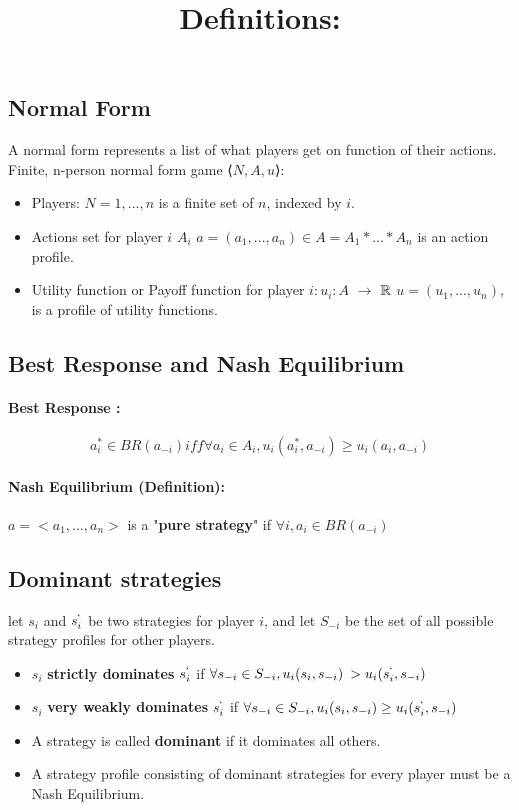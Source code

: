\subsection{Normal Form}
A normal form represents a list of what players get on function of their actions.
Finite, n-person normal form game  ⟨$N, A, u$⟩:
\begin{itemize}
\item Players: $ N = {1, ... , n} $ is a finite set of $n$, indexed by $i$.
\item Actions set for player $i$ $A_i$
\subitem $a = (a_1,...,a_n) \in A = A_1 * ... * A_n $ is an action profile.
\item Utility function or Payoff function for player $i: u_i : A $  $\to$ ${\Bbb{R}}$
\subitem $u = (u_1,..., u_n)$, is a profile of utility functions.
\end{itemize}
\subsection{Best Response and Nash Equilibrium}\label{subsection}
\paragraph{Best Response :}
\begin{equation}\label{eq:1}
 a_i^* \in BR(a_{-i})  iff   \forall a_i \in A_i, u_i(a_i^*,a_{-i}) \geq u_i(a_i, a_{-i})
\end{equation}
 
\paragraph{Nash Equilibrium (Definition):}
$a = <a_1,...,a_n>$ is a "\textbf{pure strategy}" if $\forall i, a_i \in BR(a_{-i})$
\subsection{Dominant strategies}
let $s_i$ and $s_i^`$ be two strategies for player $i$, and let $S_{-i}$ be the set of all possible strategy profiles for other players.
\bigbreak
\title{\textbf{Definitions:} }
\begin{itemize}
\item $s_i$ \textbf{strictly dominates} $s_i^`$ if $\forall s_{-i} \in S_{-i}, u_i(s_i, s_{-i}) \>> u_i(s_i^`, s_{-i})$
\item $s_i$ \textbf{very weakly dominates} $s_i^`$ if $\forall s_{-i} \in S_{-i}, u_i(s_i, s_{-i}) \geq u_i(s_i^`, s_{-i})$
\item A strategy is called \textbf{dominant} if it dominates all others.
\item A strategy profile consisting of dominant strategies for every player must be a Nash Equilibrium.
\end{itemize}
